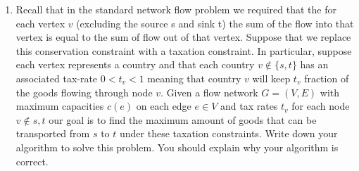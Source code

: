 \documentclass{article}
\begin{document}
\begin{enumerate}
\item Recall that in the standard network flow problem we required that the for each vertex $v$ (excluding the source s and sink t) the sum of the flow into that vertex is equal to the sum of flow out of that vertex. Suppose that we replace this conservation constraint with a taxation constraint. In particular, suppose each vertex represents a country and that each country $v \notin  \{s, t\}$ has an associated tax-rate $0 < t_v < 1$ meaning that country $v$ will keep
$t_v$ fraction of the goods flowing through node $v$. Given a flow network $G = (V, E)$ with maximum capacities $c(e)$ on each edge $e \in V$ and tax rates $t_v$ for each node $v \notin {s, t}$ our goal is to find the maximum amount of goods that can be transported from $s$ to $t$ under these taxation constraints. Write down your algorithm to solve this problem. You should explain why your algorithm is correct. 


\end{enumerate}
\end{document}
